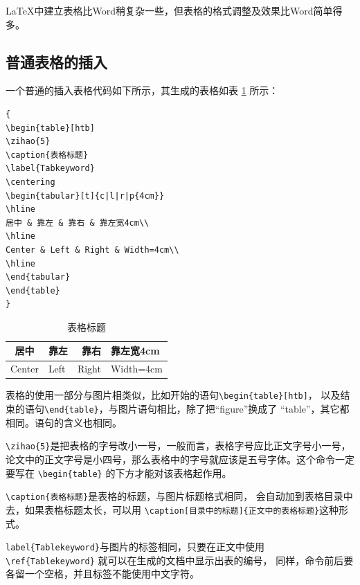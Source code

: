 \LaTeX 中建立表格比Word稍复杂一些，但表格的格式调整及效果比Word简单得多。

\subsection{普通表格的插入}

一个普通的插入表格代码如下所示，其生成的表格如表 \ref{Tabkeyword} 所示：

{
\linespread{1}
\noindent
\begin{verbatim}
{
\begin{table}[htb]
\zihao{5}
\caption{表格标题}
\label{Tabkeyword}
\centering
\begin{tabular}[t]{c|l|r|p{4cm}}
\hline
居中 & 靠左 & 靠右 & 靠左宽4cm\\
\hline
Center & Left & Right & Width=4cm\\
\hline
\end{tabular}
\end{table}
}
\end{verbatim}
}

\begin{table}[htb]
\caption{表格标题}
\label{Tabkeyword}
\centering
\begin{tabular}[t]{c|l|r|p{4cm}}
\hline
居中 & 靠左 & 靠右 & 靠左宽4cm\\
\hline
Center & Left & Right & Width=4cm\\
\hline
\end{tabular}
\end{table}

表格的使用一部分与图片相类似，比如开始的语句\verb+\begin{table}[htb]+，
以及结束的语句\verb+\end{table}+，与图片语句相比，除了把“figure”换成了
“table”，其它都相同。语句的含义也相同。

\verb+\zihao{5}+是把表格的字号改小一号，一般而言，表格字号应比正文字号小一号，
论文中的正文字号是小四号，那么表格中的字号就应该是五号字体。这个命令一定要写在
\verb+\begin{table}+ 的下方才能对该表格起作用。

\verb+\caption{表格标题}+是表格的标题，与图片标题格式相同，
会自动加到表格目录中去，如果表格标题太长，可以用
\verb+\caption[目录中的标题]{正文中的表格标题}+这种形式。

\verb+label{Tablekeyword}+与图片的标签相同，只要在正文中使用\\
\verb+\ref{Tablekeyword}+ 就可以在生成的文档中显示出表的编号，
同样，命令前后要各留一个空格，并且标签不能使用中文字符。

